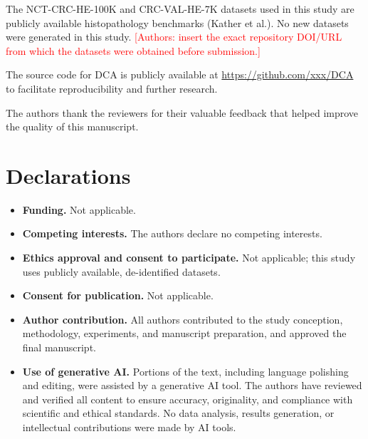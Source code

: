 \backmatter

The NCT-CRC-HE-100K and CRC-VAL-HE-7K datasets used in this study are publicly available histopathology benchmarks (Kather et al.). No new datasets were generated in this study. \textcolor{red}{[Authors: insert the exact repository DOI/URL from which the datasets were obtained before submission.]}

The source code for DCA is publicly available at \url{https://github.com/xxx/DCA} to facilitate reproducibility and further research.

The authors thank the reviewers for their valuable feedback that helped improve the quality of this manuscript.

\section*{Declarations}

\begin{itemize}
\item \textbf{Funding.} Not applicable.
\item \textbf{Competing interests.} The authors declare no competing interests.
\item \textbf{Ethics approval and consent to participate.} Not applicable; this study uses publicly available, de-identified datasets.
\item \textbf{Consent for publication.} Not applicable.
\item \textbf{Author contribution.} All authors contributed to the study conception, methodology, experiments, and manuscript preparation, and approved the final manuscript.
\item \textbf{Use of generative AI.} Portions of the text, including language polishing and editing, were assisted by a generative AI tool. The authors have reviewed and verified all content to ensure accuracy, originality, and compliance with scientific and ethical standards. No data analysis, results generation, or intellectual contributions were made by AI tools.
\end{itemize}




